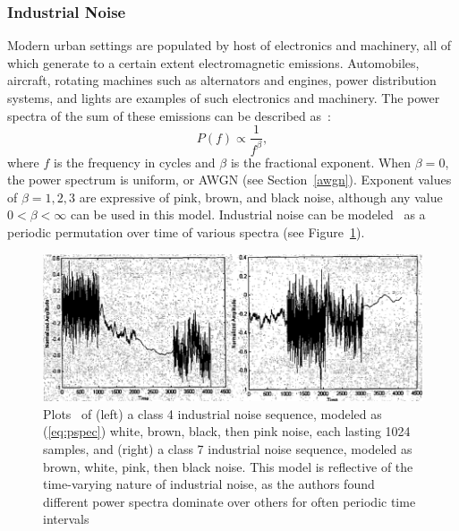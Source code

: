 \subsubsection{Industrial Noise}
Modern urban settings are populated by host of electronics and machinery, all of which generate to a certain extent electromagnetic emissions. Automobiles, aircraft, rotating machines such as alternators and engines, power distribution systems, and lights are examples of such electronics and machinery. The power spectra of the sum of these emissions can be described as~\cite{indust}:
\begin{equation}
\label{eq:pspec}
P(f) 	\propto  \frac{1}{f^{\beta}},
\end{equation}
where $f$ is the frequency in cycles and $\beta$ is the fractional exponent. When $\beta = 0$, the power spectrum is uniform, or AWGN (see Section~\ref{awgn}). Exponent values of $\beta = 1, 2, 3$ are expressive of pink, brown, and black noise, although any value $0 < \beta < \infty$ can be used in this model. Industrial noise can be modeled~\cite{indust} as a periodic permutation over time of various spectra (see Figure~\ref{fig:indust_seq}).

\FloatBarrier
\begin{figure}[ht!]
	\centering	\includegraphics[width=1\textwidth,keepaspectratio]{figs/indust_seq.png}
    \caption{Plots~\cite{indust} of (left) a class 4 industrial noise sequence, modeled as (\ref{eq:pspec}) white, brown, black, then pink noise, each lasting 1024 samples, and (right) a class 7 industrial noise sequence, modeled as brown, white, pink, then black noise. This model is reflective of the time-varying nature of industrial noise, as the authors found different power spectra dominate over others for often periodic time intervals~\cite{indust}} 
\label{fig:indust_seq}      
\end{figure}
\FloatBarrier

